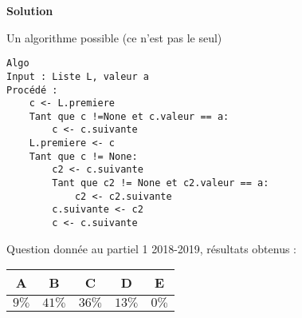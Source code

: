 \begin{exercice}
\vspace{0.5cm}

\textbf{Solution}

Un algorithme possible (ce n'est pas le seul)

\begin{lstlisting}
Algo
Input : Liste L, valeur a
Procédé :
    c <- L.premiere
    Tant que c !=None et c.valeur == a:
        c <- c.suivante
    L.premiere <- c
    Tant que c != None:
        c2 <- c.suivante
        Tant que c2 != None et c2.valeur == a:
            c2 <- c2.suivante
        c.suivante <- c2
        c <- c.suivante

\end{lstlisting}

Question donnée au partiel 1 2018-2019, résultats obtenus :

\begin{tabular}{|c|c|c|c|c|}
\hline
A & B & C & D & E \\ \hline
$9\%$ & $41\%$ & $36\%$ & $13\%$ & $0\%$ \\ \hline
\end{tabular} 

\end{exercice}
